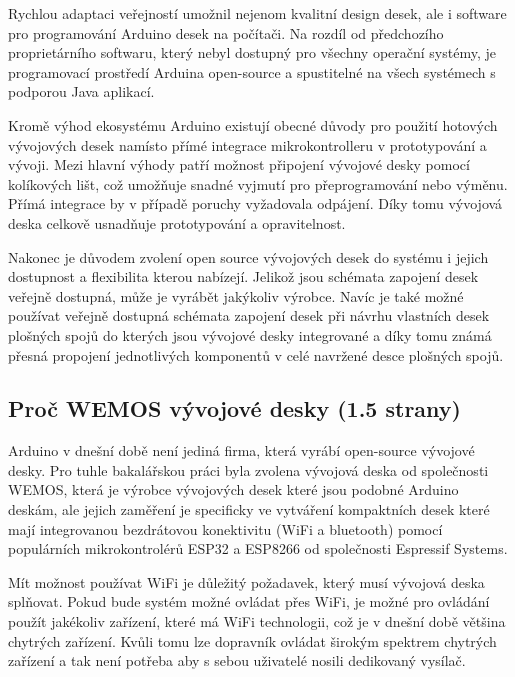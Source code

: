 Rychlou adaptaci veřejností umožnil nejenom kvalitní design desek, ale i software pro programování Arduino desek na počítači. Na rozdíl od předchozího proprietárního softwaru, který nebyl dostupný pro všechny operační systémy, je programovací prostředí Arduina open-source a spustitelné na všech systémech s podporou Java aplikací.
\cite{KnihaOArduinu}

Kromě výhod ekosystému Arduino existují obecné důvody pro použití hotových vývojových desek namísto přímé integrace mikrokontrolleru v prototypování a vývoji. Mezi hlavní výhody patří možnost připojení vývojové desky pomocí kolíkových lišt, což umožňuje snadné vyjmutí pro přeprogramování nebo výměnu. Přímá integrace by v případě poruchy vyžadovala odpájení. Díky tomu vývojová deska celkově usnadňuje prototypování a opravitelnost.

Nakonec je důvodem zvolení open source vývojových desek do systému i jejich dostupnost a flexibilita kterou nabízejí. Jelikož jsou schémata zapojení desek veřejně dostupná, může je vyrábět jakýkoliv výrobce. Navíc je také možné používat veřejně dostupná schémata zapojení desek při návrhu vlastních desek plošných spojů do kterých jsou vývojové desky integrované a díky tomu známá přesná propojení jednotlivých komponentů v celé navržené desce plošných spojů.

\subsection{Proč WEMOS vývojové desky (1.5 strany)}

Arduino v dnešní době není jediná firma, která vyrábí open-source vývojové desky. Pro tuhle bakalářskou práci byla zvolena vývojová deska od společnosti WEMOS, která je výrobce vývojových desek které jsou podobné Arduino deskám, ale jejich zaměření je specificky ve vytváření kompaktních desek které mají integrovanou bezdrátovou konektivitu (WiFi a bluetooth) pomocí populárních mikrokontrolérů ESP32 a ESP8266 od společnosti Espressif Systems.

Mít možnost používat WiFi je důležitý požadavek, který musí vývojová deska splňovat. Pokud bude systém možné ovládat přes WiFi, je možné pro ovládání použít jakékoliv zařízení, které má WiFi technologii, což je v dnešní době většina chytrých zařízení. Kvůli tomu lze dopravník ovládat širokým spektrem chytrých zařízení a tak není potřeba aby s sebou uživatelé nosili dedikovaný vysílač.

